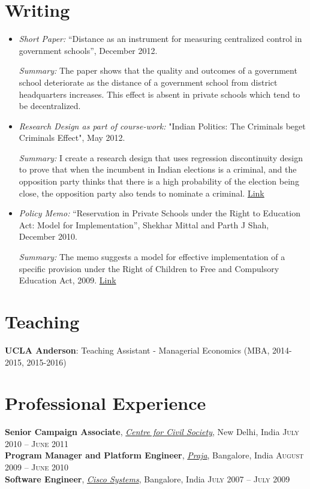 \documentclass[11pt]{article}
\begin{document}
\section{Writing}
\label{sec-3}

\begin{itemize}
\item \emph{Short Paper:} ``Distance as an instrument for measuring
centralized control in government schools'', December 2012.

\emph{Summary:} The paper shows that the quality and outcomes of a
government school deteriorate as the distance of a government school
from district headquarters increases. This effect is absent in
private schools which tend to be decentralized.

\item \emph{Research Design as part of course-work:} "Indian Politics: The
Criminals beget Criminals Effect", May 2012.

\emph{Summary:} I create a research design that uses regression
discontinuity design to prove that when the incumbent in Indian
elections is a criminal, and the opposition party thinks that there
is a high probability of the election being close, the opposition
party also tends to nominate a criminal.
\href{http://shekharmittal.info/papers/pe_researchdesign.pdf}{Link}
\end{itemize}


\begin{itemize}
\item \emph{Policy Memo:} ``Reservation in Private Schools under the Right
to Education Act: Model for Implementation'', Shekhar Mittal and
Parth J Shah, December 2010.

\emph{Summary:} The memo suggests a model for effective
implementation of a specific provision under the Right of Children
to Free and Compulsory Education Act, 2009. \href{http://shekharmittal.info/papers/viewpoint10.pdf}{Link}
\end{itemize}

\section{Teaching}
\label{sec-4}
\textbf{UCLA Anderson}: Teaching Assistant - Managerial Economics (MBA, 2014-2015, 2015-2016)

\section{Professional Experience}
\label{sec-5}
\flushleft
\textbf{Senior Campaign Associate}, \emph{\href{http://ccs.in}{Centre for Civil Society}}, New Delhi,
India \hfill \textsc{\normalsize July 2010 -- June 2011}\\
\textbf{Program Manager and Platform Engineer}, \emph{\href{http://praja.in}{Praja}}, Bangalore, India
 \hfill \textsc{\normalsize August 2009 -- June 2010}\\
\textbf{Software Engineer}, \emph{\href{http://www.cisco.com}{Cisco Systems}}, Bangalore, India \hfill \textsc{\normalsize July 2007 -- July 2009}\\
\end{document}
